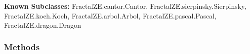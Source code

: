     \label{FractalZE:fractal:Fractal}
\textbf{Known Subclasses:}
FractalZE.cantor.Cantor,
    FractalZE.sierpinsky.Sierpinsky,
    FractalZE.koch.Koch,
    FractalZE.arbol.Arbol,
    FractalZE.pascal.Pascal,
    FractalZE.dragon.Dragon



  \subsubsection{Methods}

    \label{FractalZE:fractal:Fractal:graph}

    \vspace{0.5ex}


